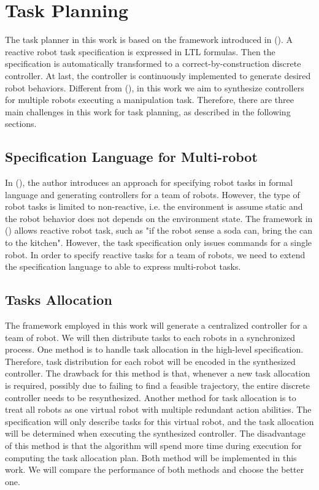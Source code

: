 \section{Task Planning}
The task planner in this work is based on the framework introduced in ().
A reactive robot task specification is expressed in LTL formulas.
Then the specification is automatically transformed to a correct-by-construction discrete controller.
At last, the controller is continuously implemented to generate desired robot behaviors.
Different from (), in this work we aim to synthesize controllers for multiple robots executing a manipulation task.
Therefore, there are three main challenges in this work for task planning, as described in the following sections.

\subsection{Specification Language for Multi-robot}
In (), the author introduces an approach for specifying robot tasks in formal language and generating controllers for a team of robots. 
However, the type of robot tasks is limited to non-reactive, i.e. the environment is assume static and the robot behavior does not depends on the environment state.
The framework in () allows reactive robot task, such as "if the robot sense a soda can, bring the can to the kitchen".
However, the task specification only issues commands for a single robot.
In order to specify reactive tasks for a team of robots, we need to extend the specification language to able to express  multi-robot tasks.

\subsection{Tasks Allocation}
The framework employed in this work will generate a centralized controller for a team of robot.
We will then distribute tasks to each robots in a synchronized process.
One method is to handle task allocation in the high-level specification.
Therefore, task distribution for each robot will be encoded in the synthesized controller.
The drawback for this method is that, whenever a new task allocation is required,
possibly due to failing to find a feasible trajectory, the entire discrete controller needs to be resynthesized.
Another method for task allocation is to treat all robots as one virtual robot with multiple redundant action abilities.
The specification will only describe tasks for this virtual robot,
and the task allocation will be determined when executing the synthesized controller.
The disadvantage of this method is that the algorithm will spend more time during execution for computing the task allocation plan.
Both method will be implemented in this work.
We will compare the performance of both methods and choose the better one.


